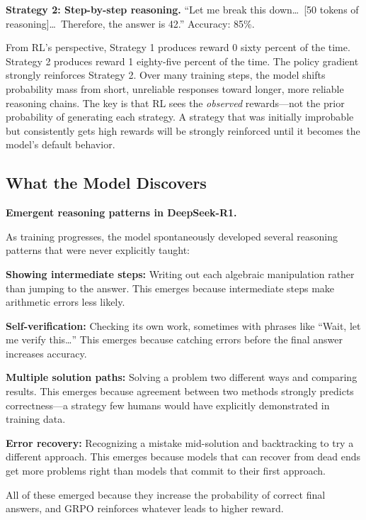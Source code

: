 \begin{chapterenv}
\textbf{Strategy 2: Step-by-step reasoning.} ``Let me break this down\ldots\ [50 tokens of reasoning]\ldots\ Therefore, the answer is 42.'' Accuracy: 85\%.

From RL's perspective, Strategy 1 produces reward 0 sixty percent of the time. Strategy 2 produces reward 1 eighty-five percent of the time. The policy gradient strongly reinforces Strategy 2. Over many training steps, the model shifts probability mass from short, unreliable responses toward longer, more reliable reasoning chains. The key is that RL sees the \textit{observed} rewards---not the prior probability of generating each strategy. A strategy that was initially improbable but consistently gets high rewards will be strongly reinforced until it becomes the model's default behavior.

\subsection{What the Model Discovers}

\begin{infobox}
\textbf{Emergent reasoning patterns in DeepSeek-R1.}

As training progresses, the model spontaneously developed several reasoning patterns that were never explicitly taught:

\textbf{Showing intermediate steps:} Writing out each algebraic manipulation rather than jumping to the answer. This emerges because intermediate steps make arithmetic errors less likely.

\textbf{Self-verification:} Checking its own work, sometimes with phrases like ``Wait, let me verify this\ldots'' This emerges because catching errors before the final answer increases accuracy.

\textbf{Multiple solution paths:} Solving a problem two different ways and comparing results. This emerges because agreement between two methods strongly predicts correctness---a strategy few humans would have explicitly demonstrated in training data.

\textbf{Error recovery:} Recognizing a mistake mid-solution and backtracking to try a different approach. This emerges because models that can recover from dead ends get more problems right than models that commit to their first approach.

All of these emerged because they increase the probability of correct final answers, and GRPO reinforces whatever leads to higher reward.
\end{infobox}


\end{chapterenv}
